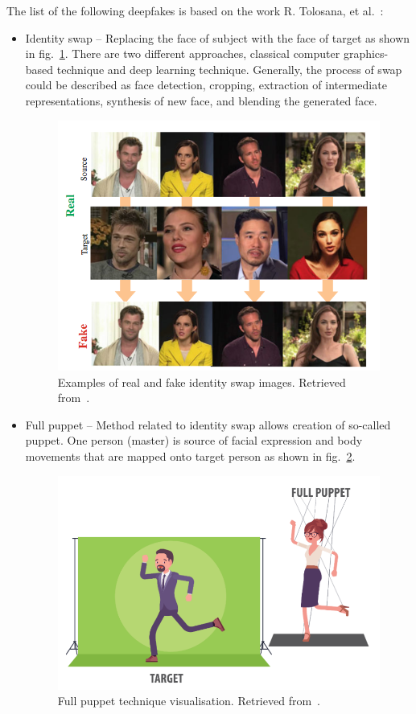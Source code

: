 The list of the following deepfakes is based on the work R. Tolosana, et al.~\cite{IntroductionToDigitalFaceManipulation}:

\begin{itemize}
    \item Identity swap – Replacing the face of subject with the face of target as shown in fig.~\ref{fig:idenity_swap}. There are two different approaches, classical computer graphics-based technique and deep learning technique. Generally, the process of swap could be described as face detection, cropping, extraction of intermediate representations, synthesis of new face, and blending the generated face.
    \begin{figure}[H]
        \centering
        \includegraphics[width=.53\linewidth]{other-fig/idenity_swap.png}
        \caption{Examples of real and fake identity swap images. Retrieved from~\cite{IntroductionToDigitalFaceManipulation}.}
        \label{fig:idenity_swap}
    \end{figure}

    \item Full puppet – Method related to identity swap allows creation of so-called puppet. One person (master) is source of facial expression and body movements that are mapped onto target person as shown in fig.~\ref{fig:full_puppet}.~\cite{IncreasingThreatofDeepfakeIdentites}
    \begin{figure}[H]
        \centering
        \includegraphics[width=.41\linewidth]{other-fig/full_puppet.png}
        \caption{Full puppet technique visualisation. Retrieved from~\cite{TheThreatOfDeepfakes}.}
        \label{fig:full_puppet}
    \end{figure}


\end{itemize}
